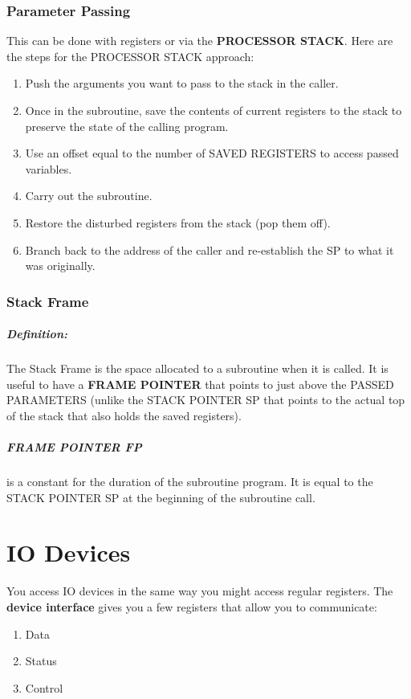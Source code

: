 \documentclass[a4paper,12pt]{report}
\begin{document}
\subsection{Parameter Passing}
This can be done with registers or via the \textbf{PROCESSOR STACK}. Here are the steps for the PROCESSOR STACK approach:
\begin{enumerate}
\item Push the arguments you want to pass to the stack in the caller.
\item Once in the subroutine, save the contents of current registers to the stack to preserve the state of the calling program.
\item Use an offset equal to the number of SAVED REGISTERS to access passed variables.
\item Carry out the subroutine.
\item Restore the disturbed registers from the stack (pop them off).
\item Branch back to the address of the caller and re-establish the SP to what it was originally.
\end{enumerate}

\subsection{Stack Frame}
\paragraph{Definition: } The Stack Frame is the space allocated to a subroutine when it is called. It is useful to 
have a \textbf{FRAME POINTER} that points to just above the PASSED PARAMETERS (unlike the STACK POINTER SP that points 
to the actual top of the stack that also holds the saved registers). 

\paragraph{FRAME POINTER FP } is a constant for the duration of the subroutine program. It is equal to the STACK POINTER SP 
at the beginning of the subroutine call.

\chapter{IO Devices}
You access IO devices in the same way you might access regular registers. The \textbf{device interface} gives you a few registers that 
allow you to communicate:
\begin{enumerate}
\item Data
\item Status
\item Control
\end{enumerate}
\end{document}
